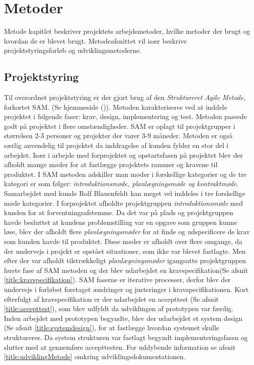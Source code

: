 \chapter{Metoder}
Metode kapitlet beskriver projektets arbejdsmetoder, hvilke metoder der brugt og hvordan de er blevet brugt. Metodeafsnittet vil især beskrive projektstyringsforløb og udviklingsmetoderne. 

\section{Projektstyring} \label{title:projektstyring}
Til overordnet projektstyring er der gjort brug af den \textit{Struktureret Agile Metode}, forkortet SAM. (Se hjemmeside (\cite{RefWorks:35})). Metoden karakteriseres ved at inddele projektet i følgende faser: krav, design, implementering og test. Metoden passede godt på projektet i flere omstændigheder. SAM er oplagt til projektgrupper i størrelsen 2-3 personer og projekter der varer 3-9 måneder. Metoden er også særlig anvendelig til projektet da inddragelse af kunden fylder en stor del i arbejdet. 
Især i arbejde med forprojektet og opstartsfasen på projektet blev der afholdt mange møder for at fastlægge projektets rammer og kravene til produktet. I SAM metoden adskiller man møder i forskellige kategorier og de tre kategori er som følger: \textit{introduktionsmøde, planlægningsmøde og kontraktmøde}. Samarbejdet med kunde Rolf Blauenfeldt kan meget vel inddeles i tre forskellige møde kategorier. I forprojektet afholdte projektgruppen \textit{introduktionsmøde} med kunden for at forventningsafstemme. Da det var på plads og projektgruppen havde besluttet at kundens problemstilling var en opgave som gruppen kunne løse, blev der afholdt flere \textit{planlægningsmøder} for at finde og udspecificere de  krav som kunden havde til produktet. Disse møder er afholdt over flere omgange, da der undervejs i projekt er opstået situationer, som ikke var blevet fastlagte. Men efter der var afholdt tilstrækkeligt \textit{planlægningsmøder} igangsatte projektgruppen første fase af SAM metoden og der blev udarbejdet en kravspecifikation(Se afsnit \ref{title:kravspecifikation}). SAM faserne er iterative processer, derfor blev der undervejs i forløbet  foretaget ændringer og justeringer i kravspecifikationen. Kort efterfulgt af kravspecifikation er der udarbejdet en accepttest (Se afsnit \ref{title:accepttest}), som blev udfyldt da udviklingen af prototypen var færdig. Inden arbejdet med prototypen begyndte, blev der udarbejdet et system design (Se afsnit \ref{title:systemdesign}), for at fastlægge hvordan systemet skulle struktureres. Da system strukturen var fastlagt begyndt implementeringsfasen og slutter med at gennemføre accepttesten. For uddybende information se afsnit \ref{title:udviklingMetode} omkring udviklingsdokumentationen.


